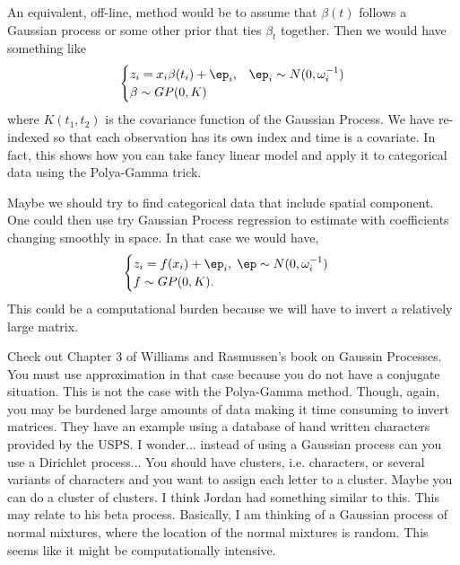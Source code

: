 \documentclass{article}
\begin{document}
An equivalent, off-line, method would be to assume that $\beta(t)$ follows a
Gaussian process or some other prior that ties $\beta_t$ together.  Then we
would have something like
\[
\begin{cases}
z_{i} = x_{i} \beta(t_i) + \ep_{i}, & \ep_{i} \sim N(0, \omega_{i}^{-1}) \\
\beta \sim GP(0, K) \\
\end{cases}
\]
where $K(t_1, t_2)$ is the covariance function of the Gaussian Process.  We have
re-indexed so that each observation has its own index and time is a covariate.
In fact, this shows how you can take fancy linear model and apply it to
categorical data using the Polya-Gamma trick.

Maybe we should try to find categorical data that include spatial component.
One could then use try Gaussian Process regression to estimate with coefficients
changing smoothly in space.  In that case we would have,
\[
\begin{cases}
z_i = f(x_i) + \ep_i, \; \ep \sim N(0, \omega_i^{-1}) \\
f \sim GP(0, K).
\end{cases}
\]
This could be a computational burden because we will have to invert a relatively
large matrix.

Check out Chapter 3 of Williams and Rasmussen's book on Gaussin Processes.  You
must use approximation in that case because you do not have a conjugate
situation.  This is not the case with the Polya-Gamma method.  Though, again,
you may be burdened large amounts of data making it time consuming to invert
matrices.  They have an example using a database of hand written characters
provided by the USPS.  I wonder... instead of using a Gaussian process can you
use a Dirichlet process... You should have clusters, i.e. characters, or several
variants of characters and you want to assign each letter to a cluster.  Maybe
you can do a cluster of clusters.  I think Jordan had something similar to this.
This may relate to his beta process.  Basically, I am thinking of a Gaussian
process of normal mixtures, where the location of the normal mixtures is random.
This seems like it might be computationally intensive.
\end{document}
